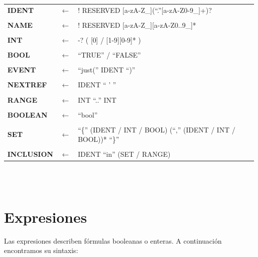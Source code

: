 \documentclass[pdftex,a4paper,12pt]{book}
\begin{document}
~\\\\
\begin{tabularx}{\textwidth}{>{\bfseries}llX}
IDENT & $\longleftarrow$ & ! RESERVED [a-zA-Z\_](``.''[a-zA-Z0-9\_]+)?\\\\
NAME & $\longleftarrow$ & ! RESERVED [a-zA-Z\_][a-zA-Z0..9\_]*\\\\
INT & $\longleftarrow$ & -? ( [0] / [1-9][0-9]* )\\\\
BOOL & $\longleftarrow$ & ``TRUE'' / ``FALSE''\\\\
EVENT & $\longleftarrow$ & ``just('' IDENT ``)''\\\\
NEXTREF & $\longleftarrow$ & IDENT `` ' ''\\\\
RANGE & $\longleftarrow$ & INT ``..'' INT\\\\
BOOLEAN & $\longleftarrow$ & ``bool''\\\\
SET & $\longleftarrow$ & ``\{'' (IDENT / INT / BOOL) (``,'' (IDENT / INT / BOOL))* ``\}''\\\\
INCLUSION & $\longleftarrow$ & IDENT ``in'' (SET / RANGE)\\
\end{tabularx}
~\\\\

\section*{Expresiones}
Las expresiones describen f\'ormulas booleanas o enteras. A continuaci\'on encontramos su sintaxis:
\end{document}
